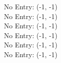 No Entry: (-1, -1) \\
No Entry: (-1, -1) \\
No Entry: (-1, -1) \\
No Entry: (-1, -1) \\
No Entry: (-1, -1) \\
No Entry: (-1, -1)